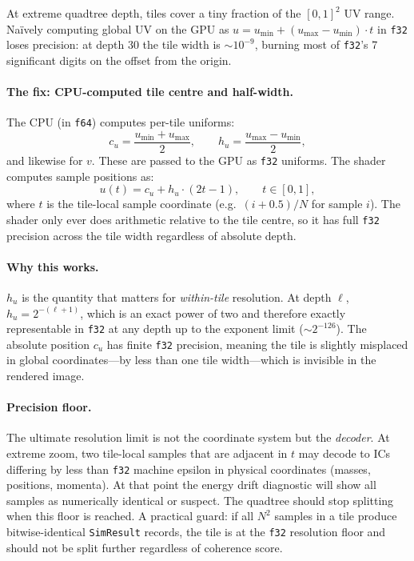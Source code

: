 \documentclass[11pt]{report}
\begin{document}
At extreme quadtree depth, tiles cover a tiny fraction of the $[0,1]^2$ UV range. Na\"ively computing global UV on the GPU as $u=u_{\min}+(u_{\max}-u_{\min})\cdot t$ in \texttt{f32} loses precision: at depth 30 the tile width is $\sim 10^{-9}$, burning most of \texttt{f32}'s 7 significant digits on the offset from the origin.

\paragraph{The fix: CPU-computed tile centre and half-width.} The CPU (in \texttt{f64}) computes per-tile uniforms:
\[
c_u=\frac{u_{\min}+u_{\max}}{2},\qquad h_u=\frac{u_{\max}-u_{\min}}{2},
\]
and likewise for $v$. These are passed to the GPU as \texttt{f32} uniforms. The shader computes sample positions as:
\[
\boxed{u(t)=c_u+h_u\cdot(2t-1),\qquad t\in[0,1],}
\]
where $t$ is the tile-local sample coordinate (e.g.\ $(i+0.5)/N$ for sample $i$). The shader only ever does arithmetic relative to the tile centre, so it has full \texttt{f32} precision across the tile width regardless of absolute depth.

\paragraph{Why this works.} $h_u$ is the quantity that matters for \emph{within-tile} resolution. At depth $\ell$, $h_u=2^{-(\ell+1)}$, which is an exact power of two and therefore exactly representable in \texttt{f32} at any depth up to the exponent limit ($\sim 2^{-126}$). The absolute position $c_u$ has finite \texttt{f32} precision, meaning the tile is slightly misplaced in global coordinates---by less than one tile width---which is invisible in the rendered image.

\paragraph{Precision floor.} The ultimate resolution limit is not the coordinate system but the \emph{decoder}. At extreme zoom, two tile-local samples that are adjacent in $t$ may decode to ICs differing by less than \texttt{f32} machine epsilon in physical coordinates (masses, positions, momenta). At that point the energy drift diagnostic will show all samples as numerically identical or suspect. The quadtree should stop splitting when this floor is reached. A practical guard: if all $N^2$ samples in a tile produce bitwise-identical \texttt{SimResult} records, the tile is at the \texttt{f32} resolution floor and should not be split further regardless of coherence score.
\end{document}
